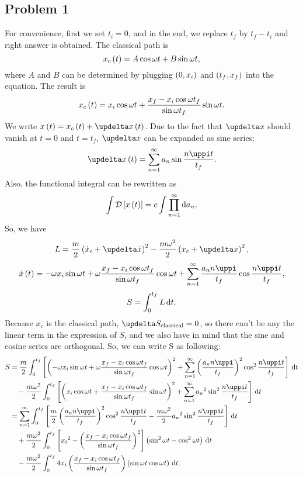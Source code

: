 \documentclass { article }
\begin{document}
\subsection*{Problem 1}
For convenience, first we set $t_i=0$, and in the end, we replace $t_f$ by $t_f-t_i$ and right answer is obtained.
The classical path is \[x_c\left( t\right)=A \cos\omega t+B\sin \omega t\text{,}\]where $A$ and $B$ can be determined by plugging $\left(0,x_i\right)$ and $\left( t_f, x_f\right)$ into the equation. The result is
\[x_c\left( t\right)=x_i \cos\omega t+\frac{x_f-x_i\cos\omega t_f}{\sin\omega t_f}\sin \omega t\text{.}\]
We write $x\lb t\rb=x_c\lb t\rb+\deltaup x\bt$. Due to the fact that $\deltaup x$ should vanish at $t=0$ and $t=t_f$, $\deltaup x$ can be expanded as sine series: \[\deltaup x\bt=\sum_{n=1}^\infty a_n\sin\frac{n\piup t}{t_f}\ed\]
Also, the functional integral can be rewritten as \[\int\mathcal{D}\left[x\left( t\right)\right]=c\int\prod_{n=1}^\infty \dd a_n\text{.}\]
So, we have
\[L=\frac{m}{2}\lb\dot{x}_c+\deltaup\dot{x}\rb^2-\frac{m\omega^2}{2}\lb x_c+\deltaup x\rb^2\ec\]
\[\dot{x}\bt=-\omega x_i \sin\omega t +\omega \frac{x_f-x_i\cos\omega t_f}{\sin\omega t_f}\cos\omega t+\sum_{n=1}^\infty\frac{a_n n \piup}{t_f}\cos\frac{n \piup t}{t_f}\ec\]
\[S=\int_0^{t_f} L\,\mathrm{d} t\text{.}\]
Because $x_c$ is the classical path, $\deltaup S_\text{classical}=0$, so there can't be any the linear term in the expression of $S$, and we also have in mind that the sine and cosine series are orthogonal. So, we can write S as following:
\[\begin{split}S&{}=\frac{m}{2}\int_0^{t_f}\left[\lb-\omega x_i\sin\omega t+\omega \frac{x_f-x_i\cos\omega t_f}{\sin\omega t_f}\cos\omega t\rb^2+\sum_{n=1}^\infty\lb\frac{a_n n \piup}{t_f}\rb^2\cos^2\frac{n \piup t}{t_f}\right]\ndd t\\%
&\quad{}-\frac{m\omega^2}{2}\int_0^{t_f}\left[\lb x_i\cos\omega t+ \frac{x_f-x_i\cos\omega t_f}{\sin\omega t_f}\sin\omega t\rb^2+\sum_{n=1}^\infty {a_n}^2\sin^2\frac{n \piup t}{t_f}\right]\ndd t\\%
&{}=\sum_{n=1}^\infty\int_0^{t_f}\left[\frac{m}{2}\lb\frac{a_n n \piup}{t_f}\rb^2\cos^2\frac{n \piup t}{t_f}-\frac{m\omega^2}{2}{a_n}^2\sin^2\frac{n \piup t}{t_f}\right]\ndd t\\%
&\quad{}+\frac{m\omega^2}{2}\int_0^{t_f}\left[ {x_i}^2-\lb\frac{x_f-x_i\cos\omega t_f}{\sin\omega t_f}\rb^2\right]\lb\sin^2\omega t-\cos^2\omega t\rb\ndd t\\%
&\quad{}-\frac{m\omega^2}{2}\int_0^{t_f}4 {x_i}\lb\frac{x_f-x_i\cos\omega t_f}{\sin\omega t_f}\rb\lb\sin\omega t\cos\omega t\rb\ndd t\ed\end{split}\]
\end{document}
